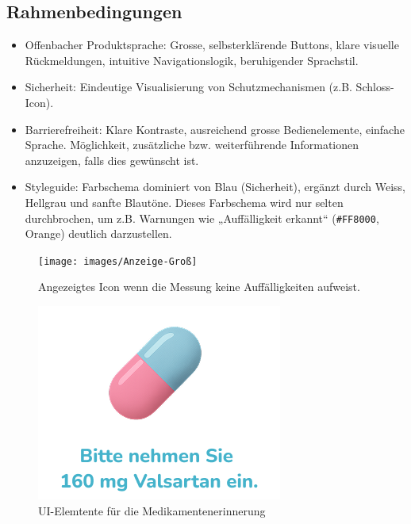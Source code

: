\vspace{1em}

\subsection{Rahmenbedingungen}
\begin{itemize}
	\item Offenbacher Produktsprache: Grosse, selbsterklärende Buttons, klare visuelle Rückmeldungen, intuitive Navigationslogik, beruhigender Sprachstil.
	\item Sicherheit: Eindeutige Visualisierung von Schutzmechanismen (z.B. Schloss-Icon).
	\item Barrierefreiheit: Klare Kontraste, ausreichend grosse Bedienelemente, einfache Sprache. Möglichkeit, zusätzliche bzw. weiterführende Informationen anzuzeigen, falls dies gewünscht ist.
	\item Styleguide: Farbschema dominiert von Blau (Sicherheit), ergänzt durch Weiss, Hellgrau und sanfte Blautöne. Dieses Farbschema wird nur selten durchbrochen, um z.B. Warnungen wie „Auffälligkeit erkannt“ (\texttt{\#FF8000}, Orange) deutlich darzustellen.
\end{itemize}

\vspace{1em}

\begin{figure}[h!]
	\centering
	\begin{minipage}{0.3\linewidth}
		\centering
		\texttt{[image: images/Anzeige-Groß]}
		\caption{Angezeigtes Icon wenn die Messung keine Auffälligkeiten aufweist.}
		\label{fig:anzeige-gros}
	\end{minipage}
	\hfill
	\begin{minipage}{0.35\linewidth}
		\centering
		\includegraphics[width=\linewidth]{images/Einnahme}
		\caption{UI-Elemtente für die Medikamentenerinnerung}
		\label{fig:einnahme}
	\end{minipage}
\end{figure}
